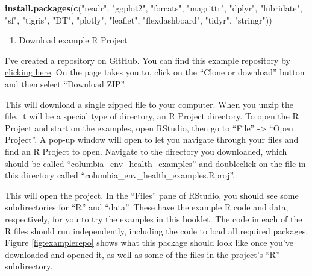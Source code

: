 \documentclass[]{tufte-book}
\newenvironment{Shaded}{}{}
\newcommand{\KeywordTok}[1]{\textcolor[rgb]{0.00,0.44,0.13}{\textbf{#1}}}
\newcommand{\NormalTok}[1]{#1}
\newcommand{\StringTok}[1]{\textcolor[rgb]{0.25,0.44,0.63}{#1}}
\providecommand{\tightlist}{%
  \setlength{\itemsep}{0pt}\setlength{\parskip}{0pt}}
\begin{document}
\begin{Shaded}
\begin{Highlighting}[]
\KeywordTok{install.packages}\NormalTok{(}\KeywordTok{c}\NormalTok{(}\StringTok{"readr"}\NormalTok{, }\StringTok{"ggplot2"}\NormalTok{, }\StringTok{"forcats"}\NormalTok{, }
    \StringTok{"magrittr"}\NormalTok{, }\StringTok{"dplyr"}\NormalTok{, }\StringTok{"lubridate"}\NormalTok{, }\StringTok{"sf"}\NormalTok{, }\StringTok{"tigris"}\NormalTok{, }
    \StringTok{"DT"}\NormalTok{, }\StringTok{"plotly"}\NormalTok{, }\StringTok{"leaflet"}\NormalTok{, }\StringTok{"flexdashboard"}\NormalTok{, }
    \StringTok{"tidyr"}\NormalTok{, }\StringTok{"stringr"}\NormalTok{))}
\end{Highlighting}
\end{Shaded}

\begin{enumerate}
\def\labelenumi{\arabic{enumi}.}
\setcounter{enumi}{3}
\tightlist
\item
  Download example R Project
\end{enumerate}

I've created a repository on GitHub. You can find this example
repository by \href{https://github.com/geanders/columbia_env_health_examples}{clicking here}. On the
page takes you to, click on the ``Clone or download'' button and then select ``Download ZIP''.

This will download a single zipped file to your computer. When you unzip the file, it will be a
special type of directory, an R Project directory. To open the R Project and start on the
examples, open RStudio, then go to ``File'' -\textgreater{} ``Open Project''. A pop-up window will open to let you
navigate through your files and find an R Project to open. Navigate to the directory you
downloaded, which should be called ``columbia\_env\_health\_examples'' and doubleclick on the file
in this directory called ``columbia\_env\_health\_examples.Rproj''.

This will open the project. In the ``Files'' pane of RStudio, you should see some subdirectories for
``R'' and ``data''. These have the example R code and data, respectively, for you to try the examples
in this booklet. The code in each of the R files should run independently, including the code to
load all required packages. Figure \ref{fig:examplerepo} shows what this package should
look like once you've downloaded and opened it, as well as some of the files in the
project's ``R'' subdirectory.
\end{document}
